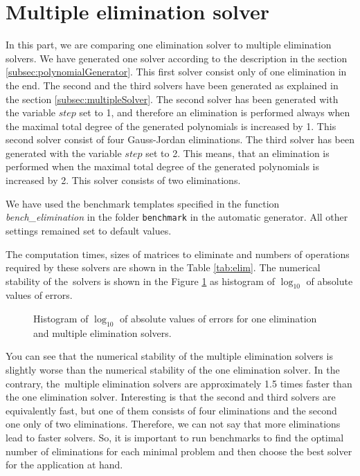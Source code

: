 \section{Multiple elimination solver}
\label{exp:elim}
In this part, we are comparing one elimination solver to multiple elimination solvers. We have generated one solver according to the description in the section \ref{subsec:polynomialGenerator}. This first solver consist only of one elimination in the end. The second and the third solvers have been generated as explained in the section \ref{subsec:multipleSolver}. The second solver has been generated with the variable $step$ set to 1, and therefore an elimination is performed always when the maximal total degree of the generated polynomials is increased by 1. This second solver consist of four Gauss-Jordan eliminations. The third solver has been generated with the variable $step$ set to 2. This means, that an elimination is performed when the maximal total degree of the generated polynomials is increased by 2. This solver consists of two eliminations.

We have used the benchmark templates specified in the function \textit{bench\_elimination} in the folder \texttt{benchmark} in the automatic generator. All other settings remained set to default values.

The computation times, sizes of matrices to eliminate and numbers of operations required by these solvers are shown in the Table \ref{tab:elim}. The numerical stability of the~solvers is shown in the Figure \ref{graph:elim} as histogram of $\log_{10}$ of absolute values of errors.

\begin{figure}[ht]
  \centering
  \resizebox{0.95\textwidth}{!}{}
  \caption{Histogram of $\log_{10}$ of absolute values of errors for one elimination and multiple elimination solvers.}
  \label{graph:elim}
\end{figure}

You can see that the numerical stability of the multiple elimination solvers is slightly worse than the numerical stability of the one elimination solver. In the contrary, the~multiple elimination solvers are approximately 1.5 times faster than the one elimination solver. Interesting is that the second and third solvers are equivalently fast, but one of them consists of four eliminations and the second one only of two eliminations. Therefore, we can not say that more eliminations lead to faster solvers. So, it is important to run benchmarks to find the optimal number of eliminations for each minimal problem and then choose the best solver for the application at hand.

